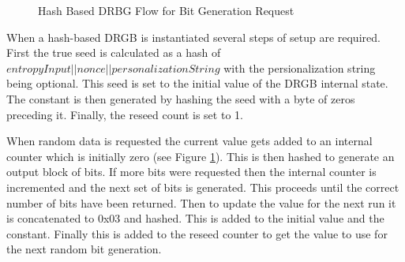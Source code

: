 \documentclass[sigconf]{acmart}
\begin{document}
\begin{figure}[ht]
\caption{Hash Based DRBG Flow for Bit Generation Request\cite{barker2015nist90a}}
\label{fig:DRBG}
\end{figure}

When a hash-based DRGB is instantiated several steps of setup are required\cite{barker2015nist90a}. First the true seed is calculated as a hash of \\$entropyInput || nonce || personalizationString$ with the persionalization string being optional. This seed is set to the initial value of the DRGB internal state. The constant is then generated by hashing the seed with a byte of zeros preceding it. Finally, the reseed count is set to 1. 

When random data is requested the current value gets added to an internal counter which is initially zero (see Figure \ref{fig:DRBG}). This is then hashed to generate an output block of bits. If more bits were requested then the internal counter is incremented and the next set of bits is generated. This proceeds until the correct number of bits have been returned. Then to update the value for the next run it is concatenated to 0x03 and hashed. This is added to the initial value and the constant. Finally this is added to the reseed counter to get the value to use for the next random bit generation. 
\end{document}
